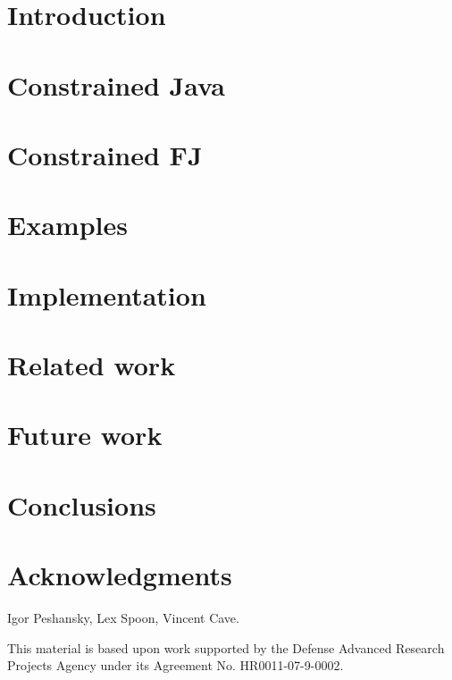 \documentclass[nocopyrightspace,preprint,9pt]{sigplanconf}
\begin{document}
\section{Introduction}
\label{sec:intro}


\section{Constrained Java}
\label{sec:lang}


\section{Constrained FJ}
\label{sec:semantics}


\section{Examples}
\label{sec:examples}


\section{Implementation}
\label{sec:implementation}


\section{Related work}
\label{sec:related}


\section{Future work}
\label{sec:future}


\section{Conclusions}
\label{sec:conclusions}


\section*{Acknowledgments}

Igor Peshansky,
Lex Spoon,
Vincent Cave.

This material is based upon work supported by the Defense
Advanced Research Projects Agency under its Agreement No.
HR0011-07-9-0002.




\balance


% 
\end{document}
